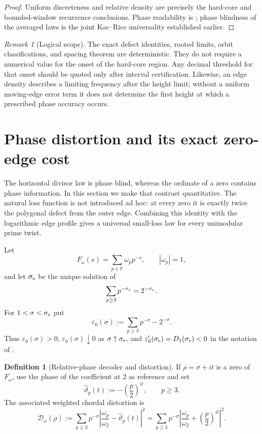 \documentclass[11pt]{article}
\theoremstyle{definition}
\newtheorem{definition}[theorem]{Definition}
\theoremstyle{remark}
\newtheorem{remark}[theorem]{Remark}
\newcommand{\PP}{\mathbb P}
\newcommand{\eps}{\varepsilon}
\begin{document}
\begin{proof}
Uniform discreteness and relative density are precisely the hard-core
and bounded-window recurrence conclusions.  Phase readability is
; phase blindness of the averaged laws is
the joint Kac--Rice universality established earlier.
\end{proof}

\begin{remark}[Logical scope]
The exact defect identities, rooted limits, orbit classifications, and
spacing theorem are deterministic.  They do not require a numerical
value for the onset of the hard-core region.  Any decimal threshold for
that onset should be quoted only after interval certification.  Likewise,
an edge density describes a limiting frequency after the height limit;
without a uniform moving-edge error term it does not determine the first
height at which a prescribed phase accuracy occurs.
\end{remark}
\section{Phase distortion and its exact zero-edge cost}
\label{sec:phase-distortion}

The horizontal divisor law is phase blind, whereas the ordinate of a zero
contains phase information.  In this section we make that contrast
quantitative.  The natural loss function is not introduced ad hoc: at every
zero it is exactly twice the polygonal defect from the outer edge.  Combining
this identity with the logarithmic edge profile gives a universal small-loss
law for every unimodular prime twist.

Let
\[
 F_\omega(s)=\sum_{p\in\PP}\omega_p p^{-s},
 \qquad |\omega_p|=1,
\]
and let $\sigma_{\rm e}$ be the unique solution of
\[
 \sum_{p\geq3}p^{-\sigma_{\rm e}}=2^{-\sigma_{\rm e}}.
\]
For $1<\sigma<\sigma_{\rm e}$ put
\begin{equation}
\label{eq:zero-edge-defect}
 \eps_0(\sigma)
 :=\sum_{p\geq3}p^{-\sigma}-2^{-\sigma}.
\end{equation}
Thus $\eps_0(\sigma)>0$, $\eps_0(\sigma)\downarrow0$ as
$\sigma\uparrow\sigma_{\rm e}$, and
$\eps_0'(\sigma_{\rm e})=D_1(\sigma_{\rm e})<0$ in the notation of
.

\begin{definition}[Relative-phase decoder and distortion]
\label{def:relative-phase-distortion}
If $\rho=\sigma+it$ is a zero of $F_\omega$, use the phase of the coefficient
at $2$ as reference and set
\[
 \widehat\vartheta_p(t):=-\left(\frac p2\right)^{it},
 \qquad p\geq3.
\]
The associated weighted chordal distortion is
\begin{equation}
\label{eq:relative-phase-distortion}
 \mathcal D_\omega(\rho)
 :=\sum_{p\geq3}p^{-\sigma}
 \left|\frac{\omega_p}{\omega_2}-\widehat\vartheta_p(t)\right|^2
 =\sum_{p\geq3}p^{-\sigma}
 \left|\frac{\omega_p}{\omega_2}+\left(\frac p2\right)^{it}\right|^2.
\end{equation}
\end{definition}
\end{document}
